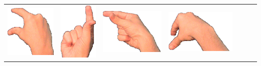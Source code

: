 \documentclass{article}
\begin{document}
\begin{center}
\begin{tabular}{r*{6}{c}}
\includegraphics[scale=0.1]{images/09-11-3.jpg}&
\includegraphics[scale=0.1]{images/09-11-4.jpg}&
\includegraphics[scale=0.1]{images/09-11-5.jpg}&
\includegraphics[scale=0.1]{images/09-11-6.jpg}\\

\end{tabular}
\end{center}
\end{document}
